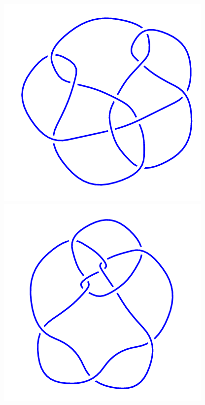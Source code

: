 \begin{figure}[H]
\begin{minipage}[b]{.18\linewidth}
	\end{minipage}
	\begin{minipage}[b]{.18\linewidth}
		\centering
		\includegraphics[width=\linewidth]{../data/10_89.png}
	\end{minipage}
	\begin{minipage}[b]{.18\linewidth}
		\centering
		\includegraphics[width=\linewidth]{../data/10_90.png}

\end{minipage}
\end{figure}
